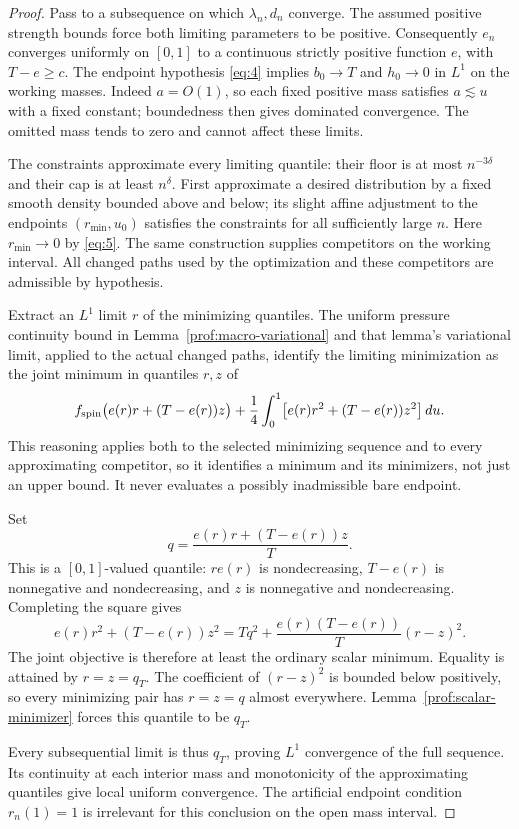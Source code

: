 \begin{proof}
Pass to a subsequence on which $\lambda_n,d_n$ converge. The
assumed positive strength bounds force both limiting parameters
to be positive. Consequently $e_n$ converges uniformly on $[0,1]$
to a continuous strictly positive function $e$, with $T-e\ge c$.
The endpoint hypothesis \eqref{eq:4} implies
$b_0\to T$ and $h_0\to0$ in $L^1$ on the working masses. Indeed
$a=O(1)$, so each fixed positive mass satisfies $a\lesssim u$
with a fixed constant; boundedness then gives dominated convergence.
The omitted mass tends to zero and cannot affect these limits.

The constraints approximate every limiting quantile: their floor
is at most $n^{-3\delta}$ and their cap is at least $n^\delta$.
First approximate a desired distribution by a fixed smooth density
bounded above and below; its slight affine adjustment to the
endpoints $(r_{\min},u_0)$ satisfies the constraints for all
sufficiently large $n$. Here $r_{\min}\to0$ by \eqref{eq:5}.
The same construction supplies competitors on the working interval.
All changed paths used by the optimization and these competitors
are admissible by hypothesis.

Extract an $L^1$ limit $r$ of the minimizing quantiles. The uniform
pressure continuity bound in Lemma~\ref{prof:macro-variational}
and that lemma's variational limit, applied to the actual changed
paths, identify the limiting minimization as the joint minimum in
quantiles $r,z$ of
\[
 f_{\rm spin}\bigl(e(r)r+(T-e(r))z\bigr)
   +\frac14\int_0^1\bigl[e(r)r^2+(T-e(r))z^2\bigr]\,du.
\]
This reasoning applies both to the selected minimizing sequence
and to every approximating competitor, so it identifies a minimum
and its minimizers, not just an upper bound. It never evaluates a
possibly inadmissible bare endpoint.

Set
\[
 q=\frac{e(r)r+(T-e(r))z}{T}.
\]
This is a $[0,1]$-valued quantile: $re(r)$ is nondecreasing,
$T-e(r)$ is nonnegative and nondecreasing, and $z$ is
nonnegative and nondecreasing. Completing the square gives
\[
 e(r)r^2+(T-e(r))z^2
   =Tq^2+\frac{e(r)(T-e(r))}{T}(r-z)^2.
\]
The joint objective is therefore at least the ordinary scalar
minimum. Equality is attained by $r=z=q_T$. The coefficient of
$(r-z)^2$ is bounded below positively, so every minimizing pair
has $r=z=q$ almost everywhere. Lemma~\ref{prof:scalar-minimizer}
forces this quantile to be $q_T$.

Every subsequential limit is thus $q_T$, proving $L^1$ convergence
of the full sequence. Its continuity at each interior mass and
monotonicity of the approximating quantiles give local uniform
convergence. The artificial endpoint condition $r_n(1)=1$ is
irrelevant for this conclusion on the open mass interval.
\end{proof}
